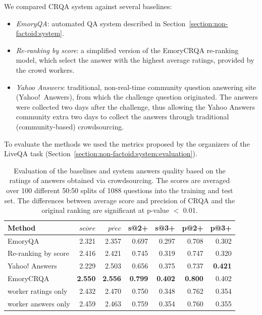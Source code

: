 We compared CRQA system against several baselines:
\begin{itemize}
\item \textit{EmoryQA}: automated QA system described in Section~\ref{section:non-factoid:system}.
\item \textit{Re-ranking by score}: a simplified version of the EmoryCRQA re-ranking model, which select the answer with the highest average ratings, provided by the crowd workers.
\item \textit{Yahoo Answers}: traditional, non-real-time community question answering site (Yahoo!~Answers), from which the challenge question originated. The answers were collected two days after the challenge, thus allowing the Yahoo Answers community extra two days to collect the answers through traditional (community-based) crowdsourcing.
\end{itemize}

To evaluate the methods we used the metrics proposed by the organizers of the LiveQA task (Section~\ref{section:non-factoid:system:evaluation}).

\begin{table}[ht]
\centering
\begin{tabular}{p{4.2cm}|rrrrrr}
Method & $\overline{score}$ & $\overline{prec}$ & s@2+ & s@3+ & p@2+ & p@3+ \\
\hline
EmoryQA & 2.321 & 2.357 & 0.697 & 0.297 &  0.708 & 0.302 \\
Re-ranking by score & 2.416 & 2.421 & 0.745 & 0.319 & 0.747 & 0.320  \\
Yahoo! Answers & 2.229 & 2.503 & 0.656 & 0.375 & 0.737 & \textbf{0.421} \\
EmoryCRQA & \textbf{2.550} & \textbf{2.556} & \textbf{0.799} & \textbf{0.402} & \textbf{0.800} & 0.402 \\
\hspace{5mm}worker ratings only & 2.432 & 2.470 & 0.750 & 0.348 & 0.762 & 0.354 \\
\hspace{5mm}worker answers only & 2.459 & 2.463 & 0.759 & 0.354 & 0.760 & 0.355 \\
\end{tabular}
\caption{Evaluation of the baselines and system answers quality based on the ratings of answers obtained via crowdsourcing. The scores are averaged over 100 different 50:50 splits of 1088 questions into the training and test set. The differences between average score and precision of CRQA and the original ranking are significant at p-value $<$ 0.01.}
\label{table:non-factoid:crowdsourcing:crqa:performance}
\end{table}

